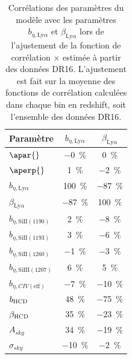 \begin{table}[]
  \centering
  \caption{Corrélations des paramètres du modèle avec les paramètres $b_{\eta,\mathrm{Ly}\alpha}$ et $\beta_{\mathrm{Ly}\alpha}$ lors de l'ajustement de la fonction de corrélation \lya{}$\times$\lya{} estimée à partir des données DR16. L'ajustement est fait sur la moyenne des fonctions de corrélation calculées dans chaque bin en redshift, soit l'ensemble des données DR16.}
  \label{tab:corr_bias_lya}
  \begin{tabular}{lcc}
    \toprule
    Paramètre  & $b_{\eta,\mathrm{Ly}\alpha}$ & $\beta_{\mathrm{Ly}\alpha}$ \\
    \midrule
    $\apar{} $ & \SI{-0}{\percent} & \SI{0}{\percent}\\
    $\aperp{} $ & \SI{1}{\percent} & \SI{-2}{\percent} \\
    $b_{\eta, \mathrm{Ly}\alpha} $ & \SI{100}{\percent} & \SI{-87}{\percent} \\
    $\beta_{\mathrm{Ly}\alpha} $ & \SI{-87}{\percent} &  \SI{100}{\percent} \\
    $b_{\eta, \mathrm{SiII}(1190)} $ & \SI{2}{\percent} & \SI{-8}{\percent} \\
    $b_{\eta, \mathrm{SiII}(1193)} $ & \SI{3}{\percent} & \SI{-6}{\percent} \\
    $b_{\eta, \mathrm{SiII}(1260)} $ & \SI{-1}{\percent} & \SI{-3}{\percent} \\
    $b_{\eta, \mathrm{SiIII}(1207)} $ & \SI{6}{\percent} & \SI{5}{\percent}\\
    $b_{\eta, CIV(\mathrm{eff})} $ &\SI{-7}{\percent} & \SI{-10}{\percent}\\
    $b_{\textsc{HCD}} $ & \SI{48}{\percent} & \SI{-75}{\percent}\\
    $\beta_{\textsc{HCD}} $ & \SI{35}{\percent} & \SI{-23}{\percent}\\
    $A_{sky} $ & \SI{34}{\percent} & \SI{-19}{\percent}\\
    $\sigma_{sky} $ & \SI{-10}{\percent} & \SI{-2}{\percent}\\
    \bottomrule
\end{tabular}
\end{table}

